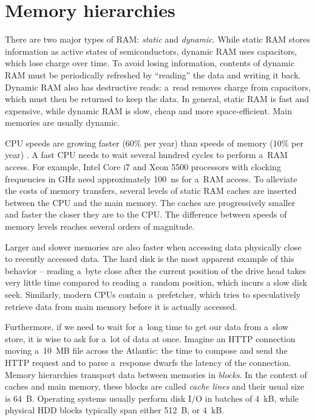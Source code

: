 \section{Memory hierarchies}
There are two major types of RAM: \emph{static} and \emph{dynamic}.
While static RAM stores information as active states of semiconductors, dynamic
RAM uses capacitors, which lose charge over time. To avoid losing information,
contents of dynamic RAM must be periodically refreshed by ``reading'' the data
and writing it back. Dynamic RAM also has destructive reads: a~read removes
charge from capacitors, which must then be returned to keep the data.
In general, static RAM is fast and expensive, while dynamic RAM is slow,
cheap and more space-efficient. Main memories are usually dynamic.

CPU speeds are growing faster (60\% per year) than speeds of memory (10\% per
year) \cite{Ailamaki:2004:DAN:1316689.1316801}.
A fast CPU needs to wait several hundred cycles to perform a~RAM access.
For example, Intel Core i7 and Xeon 5500 processors with clocking frequencies
in GHz need approximately 100~ns for a~RAM access\cite{perf-analysis-guide}.
To alleviate the costs of memory transfers, several levels of static RAM
caches are inserted between the CPU and the main memory. The caches are
progressively smaller and faster the closer they are to the CPU. The difference
between speeds of memory levels reaches several orders of magnitude.

Larger and slower memories are also faster when accessing data physically
close to recently accessed data. The hard disk is the most apparent example
of this behavior -- reading a~byte close after the current position of the drive
head takes very little time compared to reading a~random position, which incurs
a slow disk seek. %
Similarly, modern CPUs contain a~prefetcher, which tries to speculatively
retrieve data from main memory before it is actually accessed.

Furthermore, if we need to wait for a~long time to get our data from a~slow
store, it is wise to ask for a~lot of data at once. Imagine an HTTP connection
moving a~10~MB file across the Atlantic: the time to compose and send the HTTP
request and to parse a~response dwarfs the latency of the connection.
Memory hierarchies transport data between memories in \emph{blocks}.
In the context of caches and main memory, these blocks are called
\emph{cache lines} and their usual size is 64~B.
Operating systems usually perform disk I/O in batches of 4~kB,
while physical HDD blocks typically span either 512~B, or 4~kB.

